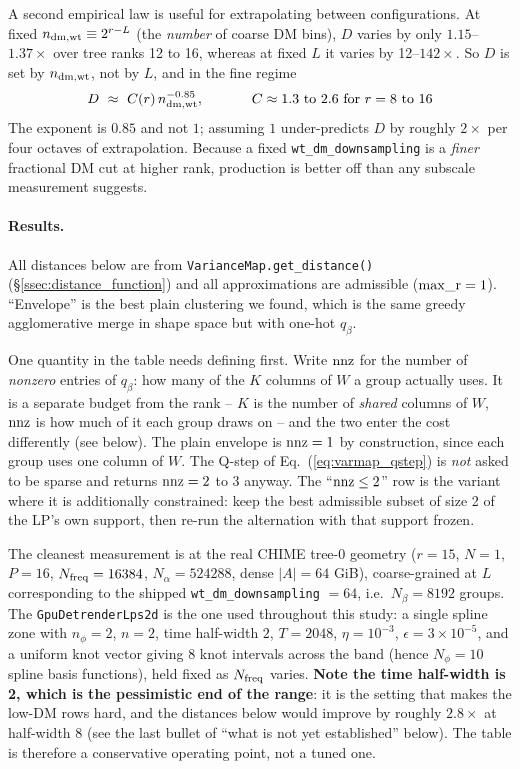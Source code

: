 \documentclass{article}
\numberwithin{equation}{section}   %
\begin{document}
A second empirical law is useful for extrapolating between configurations. At fixed
$n_{\rm dm,wt} \equiv 2^{r-L}$ (the {\em number} of coarse DM bins), $D$ varies by only
$1.15$--$1.37\times$ over tree ranks 12 to 16, whereas at fixed $L$ it varies by 12--$142\times$.
So $D$ is set by $n_{\rm dm,wt}$, not by $L$, and in the fine regime
\begin{equation}
D \ \approx \ C(r) \, n_{\rm dm,wt}^{-0.85},
\hspace{1.2cm} C \approx 1.3 \ \mbox{to} \ 2.6 \ \mbox{for} \ r = 8 \ \mbox{to} \ 16
\end{equation}
The exponent is $0.85$ and not $1$; assuming $1$ under-predicts $D$ by roughly $2\times$ per
four octaves of extrapolation. Because a fixed \verb|wt_dm_downsampling| is a {\em finer}
fractional DM cut at higher rank, production is better off than any subscale measurement
suggests.

\paragraph*{Results.}
All distances below are from \verb|VarianceMap.get_distance()| (\S\ref{ssec:distance_function}) and all
approximations are admissible (${\rm max\_r} = 1$). ``Envelope'' is the best plain clustering we
found, which is the same greedy agglomerative merge in shape space but with one-hot $q_\beta$.

One quantity in the table needs defining first. Write ${\rm nnz}$ for the number of {\em nonzero}
entries of $q_\beta$: how many of the $K$ columns of $W$ a group actually uses. It is a
separate budget from the rank -- $K$ is the number of {\em shared} columns of $W$, ${\rm nnz}$ is
how much of it each group draws on -- and the two enter the cost differently (see below).
The plain envelope is ${\rm nnz} = 1$ by construction, since each group uses one column of $W$.
The Q-step of Eq.\ (\ref{eq:varmap_qstep}) is {\em not} asked to be sparse and returns
${\rm nnz} = 2$ to $3$ anyway. The ``${\rm nnz} \le 2$'' row is the variant where it is
additionally constrained: keep the best admissible subset of size 2 of the LP's own support,
then re-run the alternation with that support frozen.

The cleanest measurement is at the real CHIME tree-0 geometry ($r{=}15$, $N{=}1$, $P{=}16$,
$N_{\rm freq} = 16384$, $N_\alpha = 524288$, dense $|A| = 64$ GiB), coarse-grained at
$L$ corresponding to the shipped \verb|wt_dm_downsampling| $=64$, i.e.\ $N_\beta = 8192$ groups.
The {\tt GpuDetrenderLps2d} is the one used throughout this study: a single spline zone with
$n_\phi = 2$, $n = 2$, time half-width $2$, $T = 2048$, $\eta = 10^{-3}$,
$\epsilon = 3\times10^{-5}$, and a uniform knot vector giving 8 knot intervals across the band
(hence $N_\phi = 10$ spline basis functions), held fixed as $N_{\rm freq}$ varies.
{\bf Note the time half-width is 2, which is the pessimistic end of the range}: it is the
setting that makes the low-DM rows hard, and the distances below would improve by roughly
$2.8\times$ at half-width 8 (see the last bullet of ``what is not yet established'' below).
The table is therefore a conservative operating point, not a tuned one.
\end{document}
